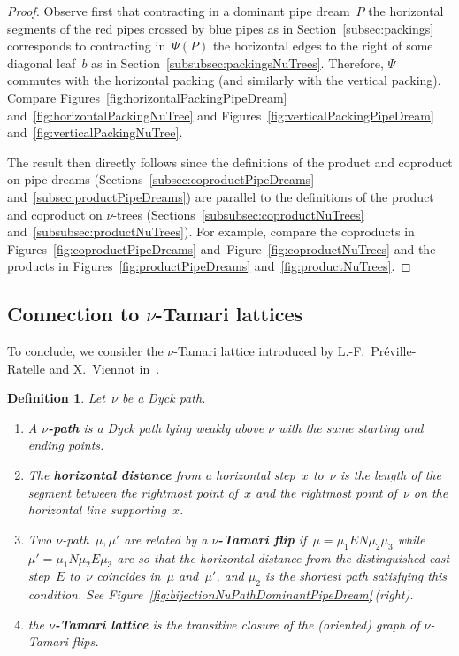 \documentclass{amsart}
\newtheorem{definition}[theorem]{Definition}
\theoremstyle{definition}
\newcommand{\fref}[1]{Figure~\ref{#1}} %
\newcommand{\defn}[1]{\textbf{\textsf{\color{PineGreen} #1}}} %
\begin{document}
\begin{proof}
Observe first that contracting in a dominant pipe dream~$P$ the horizontal segments of the red pipes crossed by blue pipes as in Section~\ref{subsec:packings} 
corresponds to contracting in~$\Psi(P)$ the horizontal edges to the right of some diagonal leaf~$b$ as in Section~\ref{subsubsec:packingsNuTrees}. 
Therefore, $\Psi$ commutes with the horizontal packing (and similarly with the vertical packing). Compare Figures~\ref{fig:horizontalPackingPipeDream} and~\ref{fig:horizontalPackingNuTree} and Figures~\ref{fig:verticalPackingPipeDream} and~\ref{fig:verticalPackingNuTree}.

The result then directly follows since the definitions of the product and coproduct on pipe dreams (Sections~\ref{subsec:coproductPipeDreams} and~\ref{subsec:productPipeDreams}) are parallel to the definitions of the product and coproduct on $\nu$-trees (Sections~\ref{subsubsec:coproductNuTrees} and~\ref{subsubsec:productNuTrees}).
For example, compare the coproducts in Figures~\ref{fig:coproductPipeDreams} and~\fref{fig:coproductNuTrees} and the products in Figures~\ref{fig:productPipeDreams} and~\ref{fig:productNuTrees}.
\end{proof}


\subsection{Connection to $\nu$-Tamari lattices} 
\label{subsec:nuTamari}

To conclude, we consider the $\nu$-Tamari lattice introduced by L.-F.~Pr\'eville-Ratelle and X.~Viennot in~\cite{PrevilleRatelleViennot}.

\begin{definition}
Let~$\nu$ be a Dyck path.
\begin{enumerate}
\item A \defn{$\nu$-path} is a Dyck path lying weakly above $\nu$ with the same starting and ending points.
\item The \defn{horizontal distance} from a horizontal step~$x$ to~$\nu$ is the length of the segment between the rightmost point of~$x$ and the rightmost point of~$\nu$ on the horizontal line supporting~$x$.
\item Two $\nu$-path~$\mu, \mu'$ are related by a \defn{$\nu$-Tamari flip} if~$\mu = \mu_1 EN \mu_2 \mu_3$ while~$\mu' = \mu_1 N \mu_2 E \mu_3$ are so that the horizontal distance from the distinguished east step~$E$ to~$\nu$ coincides in~$\mu$ and~$\mu'$, and $\mu_2$ is the shortest path satisfying this condition. See \fref{fig:bijectionNuPathDominantPipeDream}\,(right).
\item the \defn{$\nu$-Tamari lattice} is the transitive closure of the (oriented) graph of $\nu$-Tamari flips.
\end{enumerate}
\end{definition}
\end{document}
